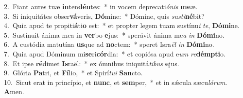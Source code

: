 {2.~}Fiant aures tuæ \textbf{in}ten\textbf{dén}tes:~* in vocem deprecati\textit{ó}\textit{nis} \textbf{me}æ.\\
{3.~}Si iniquitátes obser\textbf{vá}veris, \textbf{Dó}mine:~* Dómine, quis \textit{su}\textit{sti}\textbf{né}bit?\\
{4.~}Quia apud te propiti\textbf{á}ti\textbf{o} est:~* et propter legem tuam sustínu\textit{i} \textit{te}, \textbf{Dó}\textbf{mi}ne.\\
{5.~}Sustínuit ánima mea in \textbf{ver}bo \textbf{e}jus:~* sperávit ánima me\textit{a} \textit{in} \textbf{Dó}\textbf{mi}no.\\
{6.~}A custódia matutína \textbf{us}que ad \textbf{no}ctem:~* speret Isra\textit{ël} \textit{in} \textbf{Dó}\textbf{mi}no.\\
{7.~}Quia apud Dóminum mi\textbf{se}ri\textbf{cór}dia:~* et copiósa apud e\textit{um} \textit{re}\textbf{dém}\textbf{pti}o.\\
{8.~}Et ipse \textbf{ré}dimet \textbf{Is}raël:~* ex ómnibus iniquitá\textit{ti}\textit{bus} \textbf{e}jus.\\
{9.~}Glória \textbf{Pa}tri, et \textbf{Fí}lio,~* et Spirí\textit{tu}\textit{i} \textbf{San}cto.\\
{10.~}Sicut erat in princípio, et \textbf{nunc}, et \textbf{sem}per,~* et in sǽcula sæcu\textit{ló}\textit{rum}. \textbf{A}men.\\
